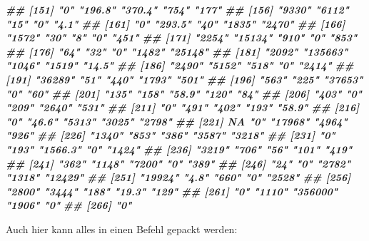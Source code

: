 \documentclass[11pt,german,a4paper]{article}
\newenvironment{Shaded}{\begin{snugshade}}{\end{snugshade}}
\newcommand{\DocumentationTok}[1]{\textcolor[rgb]{0.56,0.35,0.01}{\textbf{\textit{#1}}}}
\newcommand{\FunctionTok}[1]{\textcolor[rgb]{0.00,0.00,0.00}{#1}}
\newcommand{\NormalTok}[1]{#1}
\newcommand{\OtherTok}[1]{\textcolor[rgb]{0.56,0.35,0.01}{#1}}
\newcommand{\SpecialCharTok}[1]{\textcolor[rgb]{0.00,0.00,0.00}{#1}}
\newcommand{\StringTok}[1]{\textcolor[rgb]{0.31,0.60,0.02}{#1}}
\begin{document}
\begin{Shaded}
\begin{Highlighting}[]
\DocumentationTok{\#\# [151] "0"       "196.8"   "370.4"   "754"     "177"    }
\DocumentationTok{\#\# [156] "9330"    "6112"    "15"      "0"       "4.1"    }
\DocumentationTok{\#\# [161] "0"       "293.5"   "40"      "1835"    "2470"   }
\DocumentationTok{\#\# [166] "1572"    "30"      "8"       "0"       "451"    }
\DocumentationTok{\#\# [171] "2254"    "15134"   "910"     "0"       "853"    }
\DocumentationTok{\#\# [176] "64"      "32"      "0"       "1482"    "25148"  }
\DocumentationTok{\#\# [181] "2092"    "135663"  "1046"    "1519"    "14.5"   }
\DocumentationTok{\#\# [186] "2490"    "5152"    "518"     "0"       "2414"   }
\DocumentationTok{\#\# [191] "36289"   "51"      "440"     "1793"    "501"    }
\DocumentationTok{\#\# [196] "563"     "225"     "37653"   "0"       "60"     }
\DocumentationTok{\#\# [201] "135"     "158"     "58.9"    "120"     "84"     }
\DocumentationTok{\#\# [206] "403"     "0"       "209"     "2640"    "531"    }
\DocumentationTok{\#\# [211] "0"       "491"     "402"     "193"     "58.9"   }
\DocumentationTok{\#\# [216] "0"       "46.6"    "5313"    "3025"    "2798"   }
\DocumentationTok{\#\# [221] NA        "0"       "17968"   "4964"    "926"    }
\DocumentationTok{\#\# [226] "1340"    "853"     "386"     "3587"    "3218"   }
\DocumentationTok{\#\# [231] "0"       "193"     "1566.3"  "0"       "1424"   }
\DocumentationTok{\#\# [236] "3219"    "706"     "56"      "101"     "419"    }
\DocumentationTok{\#\# [241] "362"     "1148"    "7200"    "0"       "389"    }
\DocumentationTok{\#\# [246] "24"      "0"       "2782"    "1318"    "12429"  }
\DocumentationTok{\#\# [251] "19924"   "4.8"     "660"     "0"       "2528"   }
\DocumentationTok{\#\# [256] "2800"    "3444"    "188"     "19.3"    "129"    }
\DocumentationTok{\#\# [261] "0"       "1110"    "356000"  "1906"    "0"      }
\DocumentationTok{\#\# [266] "0"}
\end{Highlighting}
\end{Shaded}

Auch hier kann alles in einen Befehl gepackt werden:

\begin{Shaded}
\end{Shaded}
\end{document}
